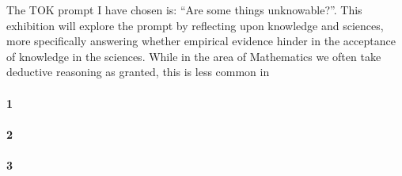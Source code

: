 \documentclass[a4paper,12pt]{article}
\begin{document}
The TOK prompt I have chosen is: ``Are some things unknowable?''. This exhibition will explore the prompt by reflecting upon knowledge and sciences, more specifically answering whether empirical evidence hinder in the acceptance of knowledge in the sciences. While in the area of Mathematics we often take deductive reasoning as granted, this is less common in 


\paragraph{1}

\paragraph{2}

\paragraph{3}
\end{document}
